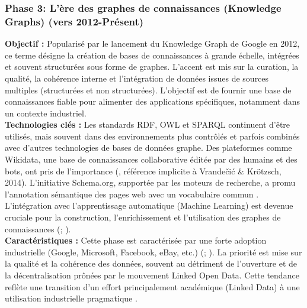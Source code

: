\documentclass[9pt,twocolumn,twoside,french]{opticajnl}
\begin{document}
\subsubsection{Phase 3: L'ère des graphes de connaissances (Knowledge Graphs) (vers 2012-Présent)}
\textbf{Objectif :} Popularisé par le lancement du Knowledge Graph de Google en 2012, ce terme désigne la création de bases de connaissances à grande échelle, intégrées et souvent structurées sous forme de graphes. L'accent est mis sur la curation, la qualité, la cohérence interne et l'intégration de données issues de sources multiples (structurées et non structurées). L'objectif est de fournir une base de connaissances fiable pour alimenter des applications spécifiques, notamment dans un contexte industriel. \\
\textbf{Technologies clés :} Les standards RDF, OWL et SPARQL continuent d'être utilisés, mais souvent dans des environnements plus contrôlés et parfois combinés avec d'autres technologies de bases de données graphe. Des plateformes comme Wikidata, une base de connaissances collaborative éditée par des humains et des bots, ont pris de l'importance (\citealp{Hitzler2021}, référence implicite à Vrandečić \& Krötzsch, 2014). L'initiative Schema.org, supportée par les moteurs de recherche, a promu l'annotation sémantique des pages web avec un vocabulaire commun \citep{Guha2015Schemaorg}. L'intégration avec l'apprentissage automatique (Machine Learning) est devenue cruciale pour la construction, l'enrichissement et l'utilisation des graphes de connaissances (\citealp{d'Amato2024Knowledge}; \citealp{Hitzler2021}). \\
\textbf{Caractéristiques :} Cette phase est caractérisée par une forte adoption industrielle (Google, Microsoft, Facebook, eBay, etc.) (\citealp{Noy2019Industryscale}; \citealp{Hitzler2021}). La priorité est mise sur la qualité et la cohérence des données, souvent au détriment de l'ouverture et de la décentralisation prônées par le mouvement Linked Open Data. Cette tendance reflète une transition d'un effort principalement académique (Linked Data) à une utilisation industrielle pragmatique \citep{Hitzler2021}.
\end{document}
